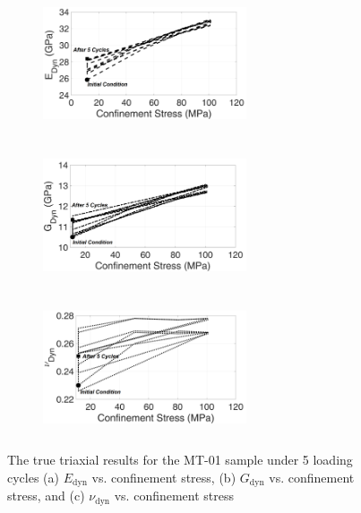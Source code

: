 \begin{figure}[ht!]
\centering
\begin{subfigure}[c]{0.48\textwidth}
\centering
\includegraphics[width=6cm,height=4cm]{figures/Amir_TrueTriaxial_MT_01_Result_E.png}
\subcaption{}
\end{subfigure}
\hfill
\begin{subfigure}[c]{0.48\textwidth}
\centering
\includegraphics[width=6cm,height=4cm]{figures/Amir_TrueTriaxial_MT_01_Result_G.png}
\subcaption{}
\end{subfigure}
\hfill
\begin{subfigure}[c]{0.48\textwidth}
\centering
\includegraphics[width=6cm,height=4cm]{figures/Amir_TrueTriaxial_MT_01_Result_Nu.png}
\subcaption{}
\end{subfigure}
\caption{The true triaxial results for the MT-01 sample under 5 loading cycles (a) $E_\text{dyn}$ vs. confinement stress, (b) $G_\text{dyn}$ vs. confinement stress, and (c) $\nu_\text{dyn}$ vs. confinement stress}
\label{fig:Amir_TrueTriaxial_MT_01_Result}
\end{figure}

